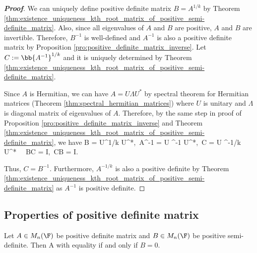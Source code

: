 \begin{proof}[\bf Proof]
We can uniquely define positive definite matrix $B = A^{1/k}$ by Theorem \ref{thm:existence_uniqueness_kth_root_matrix_of_positive_semi-definite_matrix}. Also, since all eigenvalues of $A$ and $B$
are positive, $A$ and $B$ are invertible. Therefore, $B^{-1}$ is well-defined and $A^{-1}$ is also a positive definite matrix by Proposition \ref{pro:positive_definite_matrix_inverse}. Let $C :=
\bb{A^{-1}}^{1/k}$ and it is uniquely determined by Theorem \ref{thm:existence_uniqueness_kth_root_matrix_of_positive_semi-definite_matrix}.

Since $A$ is Hermitian, we can have $A = U\Lambda U^*$ by spectral theorem for Hermitian matrices (Theorem \ref{thm:spectral_hermitian_matrices}) where $U$ is unitary and $\Lambda$ is diagonal
matrix of eigenvalues of $A$. Therefore, by the same step in proof of Proposition \ref{pro:positive_definite_matrix_inverse} and Theorem
\ref{thm:existence_uniqueness_kth_root_matrix_of_positive_semi-definite_matrix}, we have
\be
B = U\Lambda^{1/k} U^*,\ A^{-1} = U \Lambda^{-1} U^*,\ C = U \Lambda^{-1/k} U^* \ \ra\ BC = I,\ CB = I.
\ee

%

Thus, $C = B^{-1}$. Furthermore, $A^{-1/k}$ is also a positive definite by Theorem \ref{thm:existence_uniqueness_kth_root_matrix_of_positive_semi-definite_matrix} as $A^{-1}$ is positive definite.
\end{proof}

\subsection{Properties of positive definite matrix}


\begin{theorem}\label{thm:positive_definite_semidefinite_sum_determinant}
Let $A\in M_n(\F)$ be positive definite matrix and $B\in M_n(\F)$ be positive semi-definite. Then
\be
\det{} \geq \det A
\ee
with equality if and only if $B = 0$.
\end{theorem}

